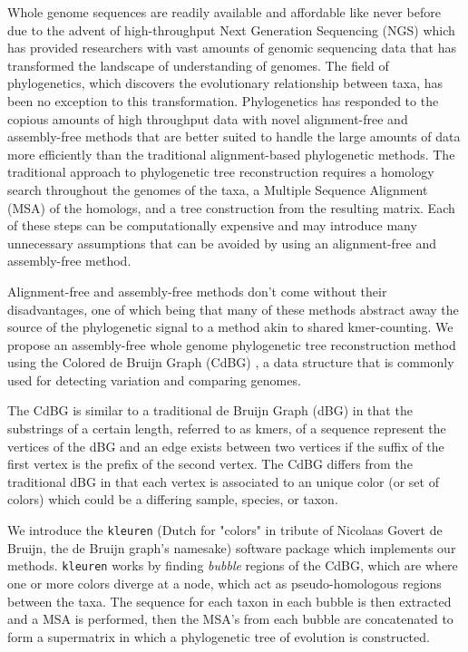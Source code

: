 \documentclass[hidelinks, 10pt, conference, compsocconf]{IEEEtran}
\begin{document}
Whole genome sequences are readily available and affordable like never before \cite{NGS} due to the advent of high-throughput Next Generation Sequencing (NGS) which has provided researchers with vast amounts of genomic sequencing data that has transformed the landscape of understanding of genomes.
The field of phylogenetics, which discovers the evolutionary relationship between taxa, has been no exception to this transformation.
Phylogenetics has responded to the copious amounts of high throughput data with novel alignment-free and assembly-free methods \cite{AAF,CVTree} that are better suited \cite{NextGenPhylo} to handle the large amounts of data more efficiently than the traditional alignment-based phylogenetic methods.
The traditional approach to phylogenetic tree reconstruction requires a homology search throughout the genomes of the taxa, a Multiple Sequence Alignment (MSA) of the homologs, and a tree construction from the resulting matrix.
Each of these steps can be computationally expensive and may introduce many unnecessary assumptions that can be avoided by using an alignment-free and assembly-free method.

Alignment-free and assembly-free methods \cite{AlignFreeReview,AlignFreeReview2,NoMSA,Cophylog} don't come without their disadvantages, one of which being that many of these methods abstract away the source of the phylogenetic signal to a method akin to shared kmer-counting.
We propose an assembly-free whole genome phylogenetic tree reconstruction method using the Colored de Bruijn Graph (CdBG) \cite{CdBG}, a data structure that is commonly used for detecting variation and comparing genomes.

The CdBG is similar to a traditional de Bruijn Graph (dBG) in that the substrings of a certain length, referred to as kmers, of a sequence represent the vertices of the dBG and an edge exists between two vertices if the suffix of the first vertex is the prefix of the second vertex.
The CdBG differs from the traditional dBG in that each vertex is associated to an unique color (or set of colors) which could be a differing sample, species, or taxon.

We introduce the \texttt{kleuren} (Dutch for "colors" in tribute of Nicolaas Govert de Bruijn, the de Bruijn graph's namesake) software package which implements our methods.
\texttt{kleuren} works by finding \textit{bubble} regions \cite{CdBG,Bubbles} of the CdBG, which are where one or more colors diverge at a node, which act as pseudo-homologous regions between the taxa. 
The sequence for each taxon in each bubble is then extracted and a MSA is performed, then the MSA's from each bubble are concatenated to form a supermatrix in which a phylogenetic tree of evolution is constructed.
\end{document}
